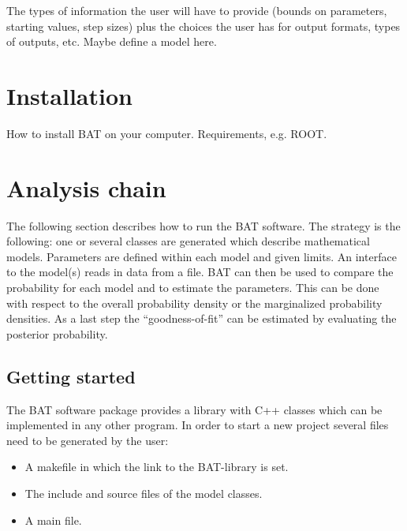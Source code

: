 \documentclass[11pt, a4paper]{article}
\begin{document}
The types of information the user will have to provide (bounds on
parameters, starting values, step sizes) plus the choices the user has
for output formats, types of outputs, etc.
Maybe define a model here. 


\section{Installation} 

How to install BAT on your computer. Requirements, e.g. ROOT. 


\section{Analysis chain}

The following section describes how to run the BAT software. The
strategy is the following: one or several classes are generated which
describe mathematical models. Parameters are defined within each model
and given limits. An interface to the model(s) reads in data from a
file. BAT can then be used to compare the probability for each model
and to estimate the parameters. This can be done with respect to the
overall probability density or the marginalized probability
densities. As a last step the ``goodness-of-fit'' can be estimated by
evaluating the posterior probability. 


\subsection{Getting started} 

The BAT software package provides a library with C++ classes which can
be implemented in any other program. In order to start a new project
several files need to be generated by the user: 
% 
\begin{itemize}
\item A makefile in which the link to the BAT-library is set. 
\item The include and source files of the model classes. 
\item A main file. 
\end{itemize} 
\end{document}
